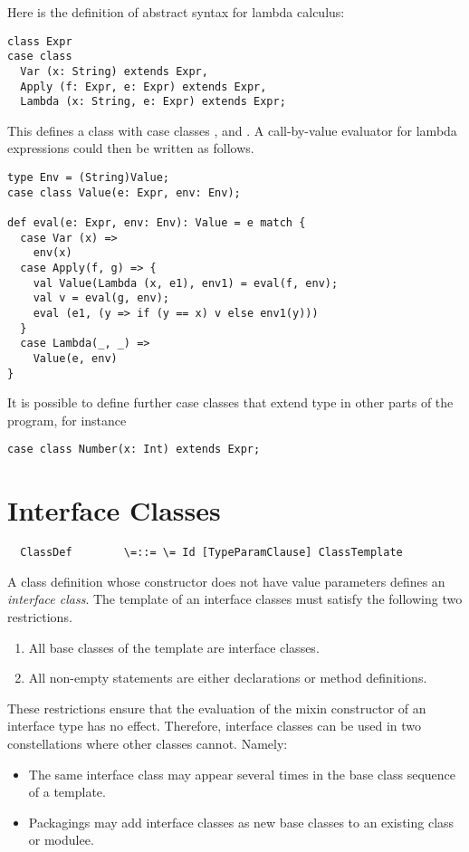 \documentclass[11pt]{report}
\begin{document}
\example Here is the definition of abstract syntax for lambda
calculus:

\begin{verbatim}
class Expr
case class
  Var (x: String) extends Expr,
  Apply (f: Expr, e: Expr) extends Expr,
  Lambda (x: String, e: Expr) extends Expr;
\end{verbatim}
This defines a class \verb@Expr@ with case classes
\verb@Var@, \verb@Apply@ and \verb@Lambda@. A call-by-value evaluator for lambda
expressions could then be written as follows.

\begin{verbatim}
type Env = (String)Value;
case class Value(e: Expr, env: Env);

def eval(e: Expr, env: Env): Value = e match {
  case Var (x) =>
    env(x)
  case Apply(f, g) => {
    val Value(Lambda (x, e1), env1) = eval(f, env);
    val v = eval(g, env);
    eval (e1, (y => if (y == x) v else env1(y)))
  }
  case Lambda(_, _) =>
    Value(e, env)
}
\end{verbatim}

It is possible to define further case classes that extend type
\verb@Expr@ in other parts of the program, for instance
\begin{verbatim}
case class Number(x: Int) extends Expr;
\end{verbatim}

\section{Interface Classes}

\label{sec:interfaces}

\syntax\begin{verbatim}
  ClassDef        \=::= \= Id [TypeParamClause] ClassTemplate
\end{verbatim}

A class definition whose constructor does not have value parameters
defines an {\em interface class}. The template of an interface classes
must satisfy the following two restrictions.
\begin{enumerate}
\item All base classes of the template are interface classes.
\item All non-empty statements are either declarations or method definitions.
\end{enumerate}
These restrictions ensure that the evaluation of the mixin constructor
of an interface type has no effect. Therefore, interface classes can be
used in two constellations where other classes cannot. Namely:
\begin{itemize}
\item The same interface class may appear several times in the base class
sequence of a template.
\item Packagings may add interface classes as new base classes to an
existing class or modulee.
\end{itemize}
\end{document}

